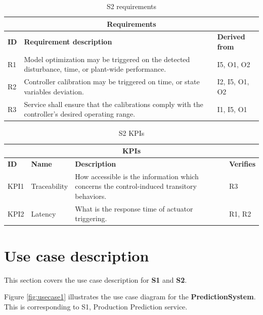 \begin{table}[hbt!]
\centering
\begin{tabularx}{\textwidth}{|p{1cm}|X|p{2.5cm}|}
\hline
\multicolumn{3}{|c|}{\textbf{Requirements}} \\
\hline
\textbf{ID} & \textbf{Requirement description} & \textbf{Derived from} \\ 
\hline            
R1 & Model optimization may be triggered on the detected disturbance, time, or plant-wide performance. & I5, O1, O2 \\ 
\hline
R2 & Controller calibration may be triggered on time, or state variables deviation. & I2, I5, O1, O2 \\ 
\hline
R3 & Service shall ensure that the calibrations comply with the controller's desired operating range. & I1, I5, O1 \\ 
\hline 
\end{tabularx}
\caption{S2 requirements}
\label{tab:s2req}
\end{table}

\begin{table}[hbt!]
\begin{tabularx}{\textwidth}{|p{1cm}|p{2cm}|X|p{1.5cm}|}
\hline
\multicolumn{4}{|c|}{\textbf{KPIs}} \\ 
\hline
\textbf{ID} & \textbf{Name} & \textbf{Description} & \textbf{Verifies} \\ 
\hline
KPI1 & Traceability & How accessible is the information which concerns the control-induced transitory behaviors. & R3 \\ 
\hline
KPI2 & Latency & What is the response time of actuator triggering. & R1, R2 \\ 
\hline
\end{tabularx}
\caption{S2 KPIs}
\label{tab:s2kpi}
\end{table}

\section{Use case description}
This section covers the use case description for \textbf{S1} and \textbf{S2}.

Figure \ref{fig:usecase1} illustrates the use case diagram for the \textbf{PredictionSystem}. This is corresponding to S1, Production Prediction service.

